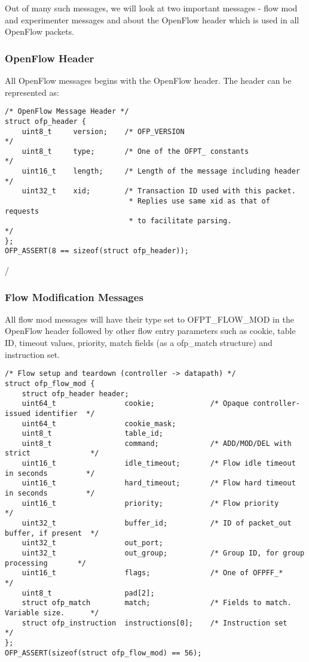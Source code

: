 \documentclass[a4paper]{article}
\begin{document}
Out of many such messages, we will look at two important messages - flow mod and experimenter messages and about the OpenFlow header which is used in all OpenFlow packets.

\subsubsection {OpenFlow Header}
All OpenFlow messages begins with the OpenFlow header. The header can be represented as:

\begin{verbatim}
/* OpenFlow Message Header */
struct ofp_header {
    uint8_t     version;    /* OFP_VERSION                              */
    uint8_t     type;       /* One of the OFPT_ constants               */
    uint16_t    length;     /* Length of the message including header   */
    uint32_t    xid;        /* Transaction ID used with this packet.    
                             * Replies use same xid as that of requests
                             * to facilitate parsing.                   */
};
OFP_ASSERT(8 == sizeof(struct ofp_header));
\end{verbatim}

/%
\subsubsection{Flow Modification Messages}
All flow mod messages will have their type set to OFPT\_FLOW\_MOD in the OpenFlow header followed by other flow entry parameters such  as cookie, table ID, timeout values, priority, match fields (as a ofp\_match structure) and instruction set.

\begin{verbatim}
/* Flow setup and teardown (controller -> datapath) */
struct ofp_flow_mod {
    struct ofp_header header;
    uint64_t                cookie;             /* Opaque controller-issued identifier  */
    uint64_t                cookie_mask; 
    uint8_t                 table_id;
    uint8_t                 command;            /* ADD/MOD/DEL with strict              */
    uint16_t                idle_timeout;       /* Flow idle timeout in seconds         */
    uint16_t                hard_timeout;       /* Flow hard timeout in seconds         */
    uint16_t                priority;           /* Flow priority                        */
    uint32_t                buffer_id;          /* ID of packet_out buffer, if present  */
    uint32_t                out_port;   
    uint32_t                out_group;          /* Group ID, for group processing       */
    uint16_t                flags;              /* One of OFPFF_*                       */
    uint8_t                 pad[2];
    struct ofp_match        match;              /* Fields to match. Variable size.      */
    struct ofp_instruction  instructions[0];    /* Instruction set                      */
};
OFP_ASSERT(sizeof(struct ofp_flow_mod) == 56);
\end{verbatim}
\end{document}
